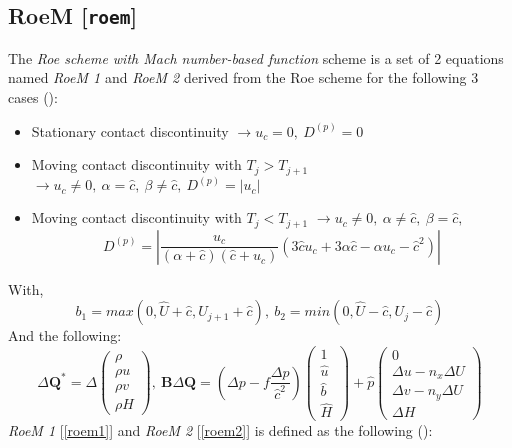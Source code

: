 \documentclass[a4paper, 12pt]{article}
\begin{document}
\subsection{RoeM [\texttt{roem}]} \label{roem}
The \textit{Roe scheme with Mach number-based function} scheme is a set of 2 equations named \textit{RoeM 1} and \textit{RoeM 2} derived from the Roe scheme for the following 3 cases (\cite{roem}):
\begin{itemize}
    \item Stationary contact discontinuity $\rightarrow{}u_c=0,\:D^{(p)}=0$
    \item Moving contact discontinuity with $T_j>T_{j+1}$ $\rightarrow{} u_c \neq 0,\:\alpha=\hat c,\:\beta\neq\hat c,\:D^{(p)}=|u_c|$
    \item Moving contact discontinuity with $T_j<T_{j+1}$ $\rightarrow{} u_c \neq 0,\:\alpha\neq\hat c,\:\beta=\hat c,$\begin{equation*}
        D^{(p)}= \left| \dfrac{u_c}{(\alpha+\hat c)(\hat c+ u_c)}(3\hat cu_c+3\alpha\hat c-\alpha u_c-\hat c^2) \right|
    \end{equation*}
\end{itemize}
With,
\begin{equation}
    b_1 = max(0, \hat U+\hat c,U_{j+1}+\hat c),\:b_2=min(0, \hat U-\hat c,U_{j}-\hat c) \label{roemb}
\end{equation}
And the following:
\begin{equation}
    \Delta\mathbf{Q}^*=\Delta\begin{pmatrix}
        \rho\\\rho u\\\rho v\\\rho H
    \end{pmatrix},\:\mathbf{B}\Delta\mathbf{Q}=\left(\Delta p-f\dfrac{\Delta p}{\hat c^2}\right)\begin{pmatrix}
        1\\\hat u\\\hat b\\\hat H
    \end{pmatrix}+\hat p\begin{pmatrix}
        0\\\Delta u-n_x\Delta U\\\Delta v-n_y\Delta U\\\Delta H
    \end{pmatrix} \label{roemmatrix}
\end{equation}
\textit{RoeM 1} [\hyperref[roem1]{\autoref{roem1}}] and \textit{RoeM 2} [\hyperref[roem2]{\autoref{roem2}}] is defined as the following (\cite{roem}):
\end{document}
